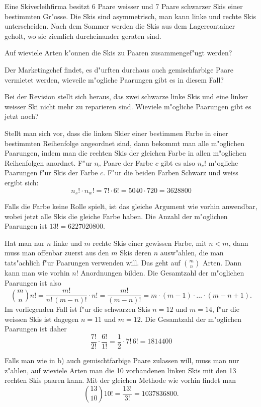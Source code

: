 Eine Skiverleihfirma besitzt 6 Paare weisser und 7 Paare schwarzer Skis
einer bestimmten Gr"osse. Die Skis sind asymmetrisch, man kann linke
und rechte Skis unterscheiden.
Nach dem Sommer werden die Skis aus dem Lagercontainer geholt, 
wo sie ziemlich durcheinander geraten sind.
\begin{teilaufgaben}
\item Auf wieviele Arten k"onnen die Skis zu Paaren zusammengef"ugt werden?
\item Der Marketingchef findet, es d"urften durchaus auch gemischfarbige Paare
vermietet werden, wieveile m"ogliche Paarungen gibt es in diesem
Fall?
\item Bei der Revision stellt sich heraus, das zwei schwarze linke Skis
und eine linker weisser Ski nicht mehr zu reparieren sind. Wieviele
m"ogliche Paarungen gibt es jetzt noch?
\end{teilaufgaben}

\begin{loesung}
\begin{teilaufgaben}
\item Stellt man sich vor, dass die linken Skier einer bestimmen
Farbe in einer bestimmten
Reihenfolge angeordnet sind, dann bekommt man alle m"oglichen Paarungen,
indem man die rechten Skis der gleichen Farbe in allen m"oglichen
Reihenfolgen anordnet.
F"ur $n_c$ Paare der Farbe $c$ gibt es also $n_c!$ m"ogliche
Paarungen f"ur Skis der Farbe $c$. F"ur die beiden Farben Schwarz
und weiss ergibt sich:
\[
n_s!\cdot n_w!=7!\cdot 6!=5040\cdot 720=3628800
\]
\item
Falls die Farbe keine Rolle spielt, ist das gleiche Argument wie vorhin
anwendbar, wobei jetzt alle Skis die gleiche Farbe haben. Die Anzahl
der m"oglichen Paarungen ist $13!=6227020800$.
\item
Hat man nur $n$ linke und $m$ rechte Skis einer gewissen Farbe, mit $n<m$,
dann muss man offenbar zuerst aus den $m$ Skis deren $n$ ausw"ahlen,
die man tats"achlich f"ur Paarungen verwenden will. Das geht auf $\binom{m}{n}$
Arten. Dann kann man wie vorhin $n!$ Anordnungen bilden. Die Gesamtzahl
der m"oglichen Paarungen ist also 
\[
\binom{m}{n}n!=\frac{m!}{n!\,(m-n)!}\cdot n!=\frac{m!}{(m-n)!}
=
m\cdot(m-1)\cdot\dots\cdot(m-n+1).
\]
Im vorliegenden Fall ist f"ur die schwarzen Skis $n=12$ und $m=14$,
f"ur die weissen Skis ist dagegen $n=11$ und $m=12$.
Die Gesamtzahl der m"oglichen Paarungen ist daher
\[
\frac{7!}{2!}\cdot \frac{6!}{1!}
=\frac12\cdot 7!\,6!=1814400
\]
\end{teilaufgaben}
Falls man wie in b) auch gemischtfarbige Paare zulassen will, muss
man nur z"ahlen, auf wieviele Arten man die 10 vorhandenen
linken Skis mit den 13 rechten Skis paaren kann. Mit der gleichen
Methode wie vorhin findet man
\[
\binom{13}{10}10!=\frac{13!}{3!}=1037836800.
\]
\end{loesung}


